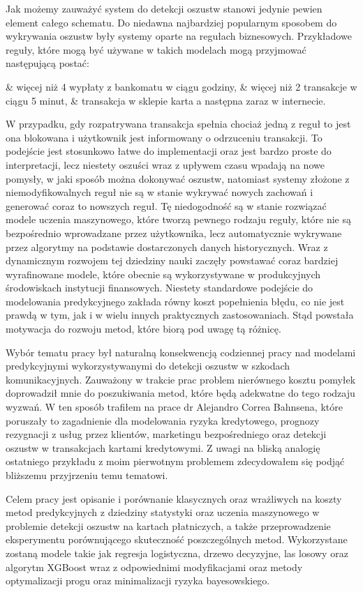 \documentclass[inzynierska]{pwr_wmat_praca_dyplomowa}
\theoremstyle{plain}
\numberwithin{theorem}{chapter}
\theoremstyle{definition}
\numberwithin{theorem}{chapter}
\begin{document}
Jak możemy zauważyć system do detekcji oszustw stanowi jedynie pewien element całego schematu. Do niedawna najbardziej popularnym sposobem do wykrywania oszustw były systemy oparte na regułach biznesowych. Przykładowe reguły, które mogą być używane w takich modelach mogą przyjmować następującą postać:
\begin{myitemize}
	& więcej niż 4 wypłaty z bankomatu w ciągu godziny,
	& więcej niż 2 transakcje w ciągu 5 minut,
	& transakcja w sklepie karta a następna zaraz w internecie.
\end{myitemize}
\noindent W przypadku, gdy rozpatrywana transakcja spełnia chociaż jedną z reguł to jest ona blokowana i użytkownik jest informowany o odrzuceniu transakcji. To podejście jest stosunkowo łatwe do implementacji oraz jest bardzo proste do interpretacji, lecz niestety oszuści wraz z upływem czasu wpadają na nowe pomysły, w jaki sposób można dokonywać oszustw, natomiast systemy złożone z niemodyfikowalnych reguł nie są w stanie wykrywać nowych zachowań i generować coraz to nowszych reguł. Tę niedogodność są w stanie rozwiązać modele uczenia maszynowego, które tworzą pewnego rodzaju reguły, które nie są bezpośrednio wprowadzane przez użytkownika, lecz automatycznie wykrywane przez algorytmy na podstawie dostarczonych danych historycznych. Wraz z dynamicznym rozwojem tej dziedziny nauki zaczęły powstawać coraz bardziej wyrafinowane modele, które obecnie są wykorzystywane w produkcyjnych środowiskach instytucji finansowych. Niestety standardowe podejście do modelowania predykcyjnego zakłada równy koszt popełnienia błędu, co nie jest prawdą w tym, jak i w wielu innych praktycznych zastosowaniach. Stąd powstała motywacja do rozwoju metod, które biorą pod uwagę tą różnicę.

Wybór tematu pracy był naturalną konsekwencją codziennej pracy nad modelami predykcyjnymi wykorzystywanymi do detekcji oszustw w szkodach komunikacyjnych. Zauważony w trakcie prac problem nierównego kosztu pomyłek doprowadził mnie do poszukiwania metod, które będą adekwatne do tego rodzaju wyzwań. W ten sposób trafiłem na prace dr Alejandro Correa Bahnsena, które poruszały to zagadnienie dla modelowania ryzyka kredytowego, prognozy rezygnacji z usług przez klientów, marketingu bezpośredniego oraz detekcji oszustw w transakcjach kartami kredytowymi. Z uwagi na bliską analogię ostatniego przykładu z moim pierwotnym problemem zdecydowałem się podjąć bliższemu przyjrzeniu temu tematowi.

Celem pracy jest opisanie i porównanie klasycznych oraz wrażliwych na koszty metod predykcyjnych z dziedziny statystyki oraz uczenia maszynowego w problemie detekcji oszustw na kartach płatniczych, a także przeprowadzenie eksperymentu porównującego skuteczność poszczególnych metod. Wykorzystane zostaną modele takie jak regresja logistyczna, drzewo decyzyjne, las losowy oraz algorytm XGBoost wraz z odpowiednimi modyfikacjami oraz metody optymalizacji progu oraz minimalizacji ryzyka bayesowskiego.
\end{document}
